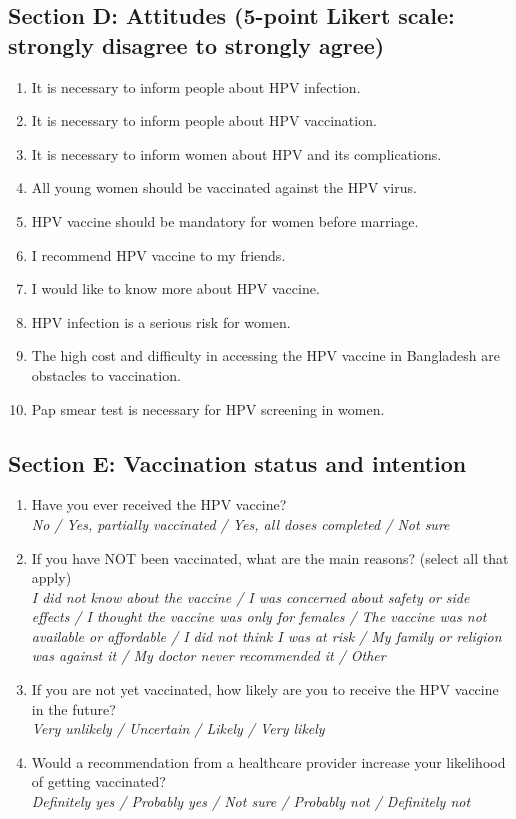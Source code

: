 \subsection*{Section D: Attitudes (5-point Likert scale: strongly disagree to strongly agree)}
\begin{enumerate}[leftmargin=*,itemsep=3pt]
\item It is necessary to inform people about HPV infection.
\item It is necessary to inform people about HPV vaccination.
\item It is necessary to inform women about HPV and its complications.
\item All young women should be vaccinated against the HPV virus.
\item HPV vaccine should be mandatory for women before marriage.
\item I recommend HPV vaccine to my friends.
\item I would like to know more about HPV vaccine.
\item HPV infection is a serious risk for women.
\item The high cost and difficulty in accessing the HPV vaccine in Bangladesh are obstacles to vaccination.
\item Pap smear test is necessary for HPV screening in women.
\end{enumerate}
\subsection*{Section E: Vaccination status and intention}
\begin{enumerate}[leftmargin=*,itemsep=3pt]
\item Have you ever received the HPV vaccine?\\\hspace*{1em}\textit{No / Yes, partially vaccinated / Yes, all doses completed / Not sure}
\item If you have NOT been vaccinated, what are the main reasons? (select all that apply)\\\hspace*{1em}\textit{I did not know about the vaccine / I was concerned about safety or side effects / I thought the vaccine was only for females / The vaccine was not available or affordable / I did not think I was at risk / My family or religion was against it / My doctor never recommended it / Other}
\item If you are not yet vaccinated, how likely are you to receive the HPV vaccine in the future?\\\hspace*{1em}\textit{Very unlikely / Uncertain / Likely / Very likely}
\item Would a recommendation from a healthcare provider increase your likelihood of getting vaccinated?\\\hspace*{1em}\textit{Definitely yes / Probably yes / Not sure / Probably not / Definitely not}
\end{enumerate}
